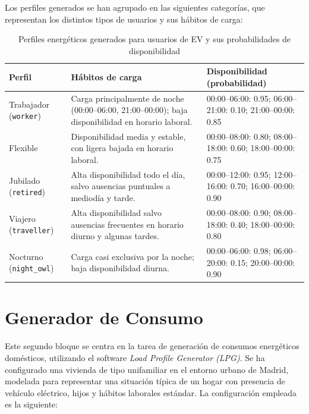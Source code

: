Los perfiles generados se han agrupado en las siguientes categorías, que representan los
distintos tipos de usuarios y sus hábitos de carga:
\begin{table}[H]
    \centering
    \begin{tabular}{p{2cm} p{7cm} p{3.5cm}}
        \toprule
        \textbf{Perfil} & \textbf{Hábitos de carga} & \textbf{Disponibilidad (probabilidad)} \\
        \midrule
        Trabajador (\texttt{worker}) &
        Carga principalmente de noche (00:00–06:00, 21:00–00:00); baja disponibilidad en horario laboral. &
        00:00–06:00: 0.95; 06:00–21:00: 0.10; 21:00–00:00: 0.85 \\
        \addlinespace[0.5ex]
        Flexible &
        Disponibilidad media y estable, con ligera bajada en horario laboral. &
        00:00–08:00: 0.80; 08:00–18:00: 0.60; 18:00–00:00: 0.75 \\
        \addlinespace[0.5ex]
        Jubilado (\texttt{retired}) &
        Alta disponibilidad todo el día, salvo ausencias puntuales a mediodía y tarde. &
        00:00–12:00: 0.95; 12:00–16:00: 0.70; 16:00–00:00: 0.90 \\
        \addlinespace[0.5ex]
        Viajero (\texttt{traveller}) &
        Alta disponibilidad salvo ausencias frecuentes en horario diurno y algunas tardes. &
        00:00–08:00: 0.90; 08:00–18:00: 0.40; 18:00–00:00: 0.80 \\
        \addlinespace[0.5ex]
        Nocturno (\texttt{night\_owl}) &
        Carga casi exclusiva por la noche; baja disponibilidad diurna. &
        00:00–06:00: 0.98; 06:00–20:00: 0.15; 20:00–00:00: 0.90 \\
        \bottomrule
    \end{tabular}
    \caption{Perfiles energéticos generados para usuarios de EV y sus probabilidades de disponibilidad}
\end{table}

\section{Generador de Consumo}
Este segundo bloque se centra en la tarea de generación de consumos energéticos domésticos,
utilizando el software \textit{Load Profile Generator (LPG)}. Se ha configurado una vivienda de
tipo unifamiliar en el entorno urbano de Madrid, modelada para representar una situación típica
de un hogar con presencia de vehículo eléctrico, hijos y hábitos laborales estándar. La configuración
empleada es la siguiente:

